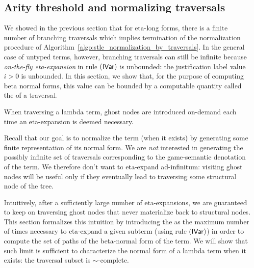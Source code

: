 \documentclass{article}
\theoremstyle{definition}
\begin{document}
\subsection{Arity threshold and normalizing traversals}

We showed in the previous section that for eta-long forms, there is a finite number of branching traversals which implies termination of the normalization procedure of Algorithm~\ref{algo:stlc_normalization_by_traversals}. In the general case of untyped terms, however, branching traversals can still be infinite because \emph{on-the-fly eta-expansion} in rule $\mathbf{({\sf IVar})}$ is unbounded: the justification label value $i>0$ is unbounded. In this section, we show that, for the purpose of computing beta normal forms, this value can be bounded by a computable quantity called the  of a traversal.

When traversing a lambda term, ghost nodes are introduced on-demand each time an eta-expansion is deemed necessary.

Recall that our goal is to normalize the term (when it exists) by generating some finite representation of its normal form. We are \emph{not} interested in generating the possibly infinite set of traversals corresponding to the game-semantic denotation of the term. We therefore don't want to eta-expand ad-infinitum: visiting ghost nodes will be useful only if they eventually lead to traversing some structural node of the tree.

Intuitively, after a sufficiently large number of eta-expansions, we are guaranteed to keep on traversing ghost nodes that never materialize back to structural nodes. This section formalizes this intuition by introducing the  as the maximum number of times necessary to eta-expand a given subterm (using rule $\mathbf{({\sf IVar})}$) in order to compute the set of paths of the beta-normal form of the term. We will show that such limit is sufficient to characterize the normal form of a lambda term when it exists: the traversal subset is $\sim$-complete.
\end{document}
